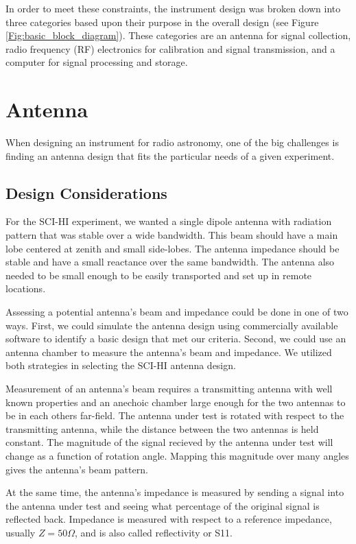 In order to meet these constraints, the instrument design was broken down into three categories based upon their purpose in the overall design (see Figure \ref{Fig:basic_block_diagram}). These categories are an antenna for signal collection, radio frequency (RF) electronics for calibration and signal transmission, and a computer for signal processing and storage.

\section{Antenna}
When designing an instrument for radio astronomy, one of the big challenges is finding an antenna design that fits the particular needs of a given experiment. 

\subsection{Design Considerations}
For the SCI-HI experiment, we wanted a single dipole antenna with radiation pattern that was stable over a wide bandwidth. This beam should have a main lobe centered at zenith and small side-lobes. The antenna impedance should be stable and have a small reactance over the same bandwidth. The antenna also needed to be small enough to be easily transported and set up in remote locations. 

Assessing a potential antenna's beam and impedance could be done in one of two ways. First, we could simulate the antenna design using commercially available software to identify a basic design that met our criteria. Second, we could use an antenna chamber to measure the antenna's beam and impedance. We utilized both strategies in selecting the SCI-HI antenna design.

Measurement of an antenna's beam requires a transmitting antenna with well known properties and an anechoic chamber large enough for the two antennas to be in each others far-field. The antenna under test is rotated with respect to the transmitting antenna, while the distance between the two antennas is held constant. The magnitude of the signal recieved by the antenna under test will change as a function of rotation angle. Mapping this magnitude over many angles gives the antenna's beam pattern. 

At the same time, the antenna's impedance is measured by sending a signal into the antenna under test and seeing what percentage of the original signal is reflected back. Impedance is measured with respect to a reference impedance, usually $Z=50 \Omega$, and is also called reflectivity or S11. \cite{stutzman1981}



